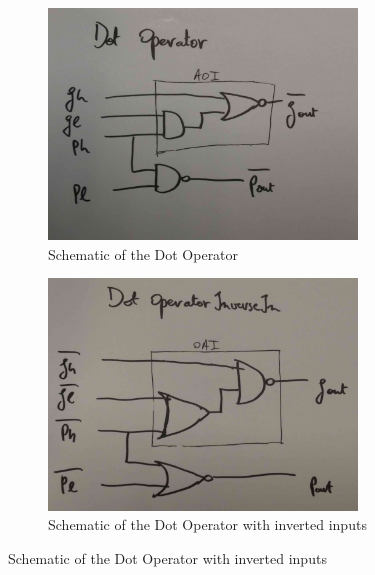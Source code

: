 \documentclass[english]{article}
\begin{document}
\begin{figure}[h!]
\centering
\begin{subfigure}{.5\textwidth}
  \centering
  \includegraphics[width=0.9\textwidth]{figures/do}
\caption{Schematic of the Dot Operator}
\label{DO}
\end{subfigure}%
\begin{subfigure}{.5\textwidth}
  \centering
  \includegraphics[width=0.9\textwidth]{figures/doi}
\caption{Schematic of the Dot Operator with inverted inputs}
\label{DOI}
\end{subfigure}
\end{figure}
\end{document}
